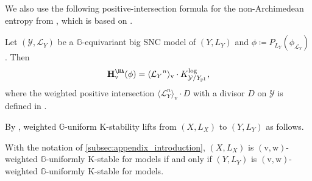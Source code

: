 \documentclass[11pt,a4paper]{article}
\begin{document}
We also use the following positive-intersection formula for the non-Archimedean entropy from \cite[Proposition~4.1]{HL25}, which is based on \cite{LiChi21,Li22cscK}.

\begin{proposition}\label{prop:positive-intersection-na-functionals}
Let $(\mathcal{Y},\mathcal{L}_Y)$ be a $\mathbb{G}$-equivariant big SNC model of $(Y,L_Y)$ and $\phi\coloneqq P_{L_Y}(\phi_{\mathcal{L}_Y})$. Then
\[
\mathbf{H}_\mathrm{v}^{\NA}(\phi)=\langle{\mathcal{L}_Y}^n\rangle_\mathrm{v}\cdot K^{\log}_{\mathcal{Y}/Y_{\mathbb{P}^1}},
\]
where the weighted positive intersection $\langle\mathcal{L}_Y^n\rangle_{\mathrm{v}}\cdot D$ with a divisor $D$ on $\mathcal{Y}$ is defined in \cite[Proposition~4.1]{HL25}.
\end{proposition}


By \cite[Proposition~4.3, Corollary~4.4]{HL25}, weighted $\mathbb{G}$-uniform K-stability lifts from $(X,L_X)$ to $(Y,L_Y)$ as follows.
\begin{proposition}
    \label{prop:lift_of_K_stability}
    With the notation of \cref{subsec:appendix_introduction}, $(X,L_X)$ is $(\mathrm{v},\mathrm{w})$-weighted $\mathbb{G}$-uniformly K-stable for models if and only if $(Y,L_Y)$ is $(\mathrm{v},\mathrm{w})$-weighted $\mathbb{G}$-uniformly K-stable for models.
\end{proposition}
\end{document}
